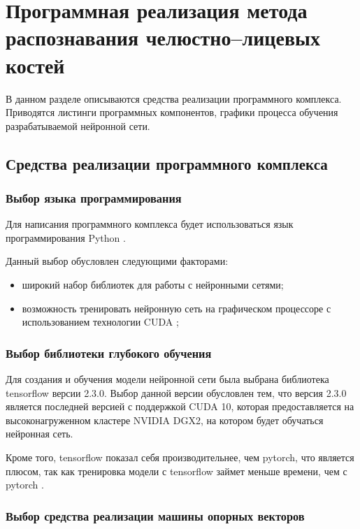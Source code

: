 \section{Программная реализация метода распознавания челюстно--лицевых костей}

В данном разделе описываются средства реализации программного комплекса. Приводятся листинги программных компонентов, графики процесса обучения разрабатываемой нейронной сети.

\subsection{Средства реализации программного комплекса}

\subsubsection{Выбор языка программирования}

Для написания программного комплекса будет использоваться язык программирования Python \cite{python}.

Данный выбор обусловлен следующими факторами:
\begin{itemize}
	\item широкий набор библиотек для работы с нейронными сетями;
	\item возможность тренировать нейронную сеть на графическом процессоре с использованием технологии CUDA \cite{cuda};
\end{itemize}

\subsubsection{Выбор библиотеки глубокого обучения}

Для создания и обучения модели нейронной сети была выбрана библиотека tensorflow \cite{tensorflow} версии 2.3.0. Выбор данной версии обусловлен тем, что версия 2.3.0 является последней версией с поддержкой CUDA 10, которая предоставляется на высоконагруженном кластере NVIDIA DGX2, на котором будет обучаться нейронная сеть.

Кроме того, tensorflow показал себя производительнее, чем pytorch, что является плюсом, так как тренировка модели с tensorflow займет меньше времени, чем с pytorch \cite{ptvstf}.

\subsubsection{Выбор средства реализации машины опорных векторов}

